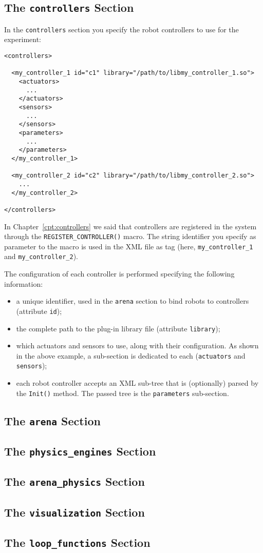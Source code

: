 \subsection{The \texttt{controllers} Section}
In the \texttt{controllers} section you specify the robot controllers
to use for the experiment:
\begin{lstlisting}
<controllers>

  <my_controller_1 id="c1" library="/path/to/libmy_controller_1.so">
    <actuators>
      ...
    </actuators>
    <sensors>
      ...
    </sensors>
    <parameters>
      ...
    </parameters>
  </my_controller_1>

  <my_controller_2 id="c2" library="/path/to/libmy_controller_2.so">
    ...
  </my_controller_2>

</controllers>
\end{lstlisting}
In Chapter~\ref{cpt:controllers} we said that controllers are
registered in the system through the \texttt{REGISTER\_CONTROLLER()}
macro. The string identifier you specify as parameter to the macro is used
in the XML file as tag (here, \texttt{my\_controller\_1} and
\texttt{my\_controller\_2}).

The configuration of each controller is performed specifying the
following information:
\begin{itemize}
\item a unique identifier, used in the \texttt{arena} section to bind
  robots to controllers (attribute \texttt{id});
\item the complete path to the plug-in library file (attribute
  \texttt{library});
\item which actuators and sensors to use, along with their
  configuration. As shown in the above example, a sub-section is
  dedicated to each (\texttt{actuators} and \texttt{sensors});
\item each robot controller accepts an XML sub-tree that is (optionally)
  parsed by the \texttt{Init()} method. The passed tree is the
  \texttt{parameters} sub-section.
\end{itemize}

\subsection{The \texttt{arena} Section}
\subsection{The \texttt{physics\_engines} Section}
\subsection{The \texttt{arena\_physics} Section}
\subsection{The \texttt{visualization} Section}
\subsection{The \texttt{loop\_functions} Section}

